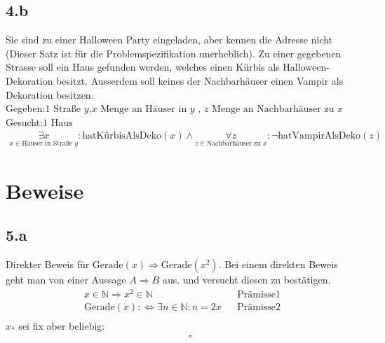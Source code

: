 \documentclass[10pt,ngerman]{scrartcl}
\begin{document}
\subsection{4.b}
Sie sind zu einer Halloween Party eingeladen, aber kennen die Adresse nicht (Dieser
Satz ist für die Problemspezifikation unerheblich).
Zu einer gegebenen Strasse soll ein Haus gefunden werden, welches einen Kürbis
als Halloween-Dekoration besitzt. Ausserdem soll keines der Nachbarhäuser einen
Vampir als Dekoration besitzen.\vspace{0.5 cm}\\
Gegeben:$ 1 \text{ Straße } y \text{,} x \text{ Menge an Häuser in } y \text{ , } z\text{ Menge an Nachbarhäuser zu } x$\\
Gesucht:$ 1 \text{ Haus}$
\setcounter{equation}{0}
\begin{align*}
\underset{x \in \text{Häuser in Straße } y}{\exists x} : \text{hatKürbisAlsDeko}(x) \wedge \underset{z \in \text{Nachbarhäuser zu }x}{\forall z} : \neg \text{hatVampirAlsDeko}(z)
\end{align*}
\pagebreak
\section{Beweise}
\subsection{5.a}
Direkter Beweis für $\text{Gerade}(x) \Rightarrow \text{Gerade}(x^2)$. Bei einem direkten Beweis geht man von einer Aussage $A \Rightarrow B$ aus.  und versucht diesen zu bestätigen.
\setcounter{equation}{0}
\begin{align}
x \in \mathbb{N} \Rightarrow x^2 \in \mathbb{N} && \text{Prämisse} 1\\
\text{Gerade}(x): \Leftrightarrow \exists n \in \mathbb{N} : n = 2x && \text{Prämisse} 2\\
\end{align}
$x_*$ sei fix aber beliebig:\\
\begin{align}
[\text{Gerade}(x_*) \Rightarrow \exists n \in \mathbb{N} : x_* = 2n && x_* \text{ in Prämisse } 2 \text{ einsetzten}\\
(x_*)^2 = (2n)^2 && x_* \text{quadriert}\\
x_*^2 = 4n^2 \\
x_*^2 = 2 \underbrace{(2n^2)}_{n^2 \in \mathbb{N} \Rightarrow n^2 = k}\\
x^2 = 2k \Rightarrow \text{Gerade}(x_*^2)] &&\square
\end{align}
\end{document}
